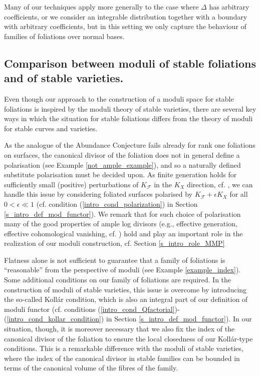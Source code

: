 \documentclass[12pt, a4paper]{amsart}
\theoremstyle{definition}
\theoremstyle{named}
\begin{document}
Many of our techniques apply more generally to the case where $\Delta$ has arbitrary coefficients, or we consider an integrable distribution together with a boundary with arbitrary coefficients, but in this setting we only capture the behaviour of families of foliations over normal bases. 



\subsection{Comparison between moduli of stable foliations and of stable varieties.}
\label{s_intro_challenges}
Even though our approach to the construction of a moduli space for stable foliations is inspired by the moduli theory of stable varieties, 
there are several key ways in which the situation for stable foliations differs from the theory of moduli for stable curves and varieties.

As the analogue of the Abundance Conjecture fails already for rank one foliations on surfaces, the canonical divisor of the foliation does not in general define a polarisation (see Example \ref{not_ample_example}), and so a naturally defined substitute polarisation must be decided upon.
    As finite generation holds for sufficiently small (positive) perturbations of $K_{\mathcal F}$ in the $K_X$ direction, cf. 
    \cite{SS23}, we can handle this issue by considering foliated surfaces polarised by 
    $K_{\mathcal F}+\epsilon K_{X}$ for all $0<\epsilon\ll 1$ 
    (cf. condition (\ref{intro_cond_polarization}) in Section \ref{s_intro_def_mod_functor}).
    We remark that for such choice of polarisation many of the good properties of ample log divisors (e.g., effective generation, effective cohomological vanishing, cf. \cite{PS16}) hold and play an important role in the realization of our moduli construction, cf. Section \ref{s_intro_role_MMP}
 
 Flatness alone is not sufficient to guarantee that a family of foliations is ``reasonable'' from the perspective of moduli (see Example \ref{example_index}). Some additional conditions on our family of foliations are required.
    In the construction of moduli of stable varieties, this issue is overcome by introducing the so-called Koll\'ar condition, which is also an integral part of our definition of moduli functor (cf. conditions (\ref{intro_cond_Qfactorial})-(\ref{intro_cond_kollar_condition}) in Section \ref{s_intro_def_mod_functor}).  In our situation, though,  it is moreover necessary that we also fix the index of the canonical divisor of the foliation to ensure the local closedness of our Koll\'ar-type conditions.
    This is a remarkable difference with the moduli of stable varieties, where the index of the canonical divisor in stable families can be bounded in terms of the canonical volume of the fibres of the family.
    
\end{document}
